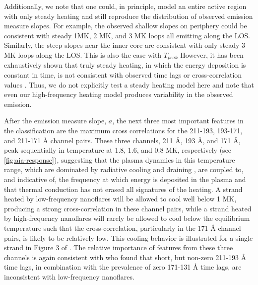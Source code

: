 Additionally, we note that one could, in principle, model an entire active region with only steady heating and still reproduce the distribution of observed emission measure slopes.
For example, the observed shallow slopes on periphery could be consistent with steady 1MK, 2 MK, and 3 MK loops all emitting along the LOS.
Similarly, the steep slopes near the inner core are consistent with only steady 3 MK loops along the LOS.
This is also the case with $T_{peak}$
However, it has been exhaustively shown that truly steady heating, in which the energy deposition is constant in time, is not consistent with observed time lags or cross-correlation values \citep[e.g.][]{viall_signatures_2016}.
Thus, we do not explicitly test a steady heating model here and note that even our high-frequency heating model produces variability in the observed emission.

After the emission measure slope, $a$, the next three most important features in the classification are the maximum cross correlations for the 211-193, 193-171, and 211-171 \AA{} channel pairs.
These three channels, 211 \AA{}, 193 \AA{}, and 171 \AA{}, peak sequentially in temperature at 1.8, 1.6, and 0.8 MK, respectively (see \autoref{fig:aia-response}), suggesting that the plasma dynamics in this temperature range, which are dominated by radiative cooling and draining \citep[e.g.][]{bradshaw_cooling_2005,bradshaw_cooling_2010,bradshaw_new_2010}, are coupled to, and indicative of, the frequency at which energy is deposited in the plasma and that thermal conduction has not erased all signatures of the heating.
A strand heated by low-frequency nanoflares will be allowed to cool well below 1 MK, producing a strong cross-correlation in these channel pairs, while a strand heated by high-frequency nanoflares will rarely be allowed to cool below the equilibrium temperature such that the cross-correlation, particularly in the 171 \AA{} channel pairs, is likely to be relatively low.
This cooling behavior is illustrated for a single strand in Figure 3 of .
The relative importance of features from these three channels is again consistent with \citet{bradshaw_patterns_2016} who found that short, but non-zero 211-193 \AA{} time lags, in combination with the prevalence of zero 171-131 \AA{} time lags, are inconsistent with low-frequency nanoflares.

